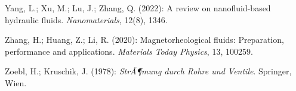 ﻿\documentclass[a4paper,12pt]{scrreprt}
\theoremstyle{definition}
\begin{document}
\begin{enumerate}[label={[\arabic*]}]
  \item Yang, L.; Xu, M.; Lu, J.; Zhang, Q. (2022): A review on
    nanofluid-based hydraulic fluids. \textit{Nanomaterials}, 12(8),
    1346.

  \item Zhang, H.; Huang, Z.; Li, R. (2020): Magnetorheological fluids:
    Preparation, performance and applications. \textit{Materials Today
    Physics}, 13, 100259.

  \item Zoebl, H.; Kruschik, J. (1978): \textit{StrÃ¶mung durch
    Rohre und Ventile}. Springer, Wien.

\end{enumerate}
\end{document}
